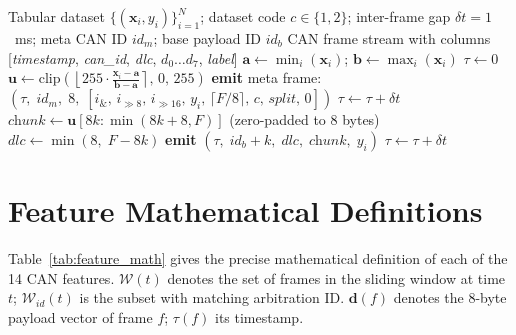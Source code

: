 \begin{algorithm}[t]
\caption{Tabular-to-CAN Frame Encoding}
\label{alg:b2can}
\begin{algorithmic}[1]
\Require Tabular dataset $\{(\mathbf{x}_i, y_i)\}_{i=1}^{N}$; dataset code $c \in \{1,2\}$;
         inter-frame gap $\delta t = 1$~ms; meta CAN ID $\textit{id}_m$; base payload ID $\textit{id}_b$
\Ensure CAN frame stream with columns [\textit{timestamp}, \textit{can\_id}, \textit{dlc}, $d_0\ldots d_7$, \textit{label}]
\State $\mathbf{a} \leftarrow \min_i(\mathbf{x}_i)$;\; $\mathbf{b} \leftarrow \max_i(\mathbf{x}_i)$ 
\State $\tau \leftarrow 0$
    \State $\mathbf{u} \leftarrow \mathrm{clip}\!\left(\left\lfloor 255 \cdot \tfrac{\mathbf{x}_i - \mathbf{a}}{\mathbf{b} - \mathbf{a}} \right\rceil,\, 0,\, 255\right)$ 
    \State \textbf{emit} meta frame: $(\tau,\; \textit{id}_m,\; 8,\;
           [i_{\&},\, i_{\gg 8},\, i_{\gg 16},\, y_i,\, \lceil F/8\rceil,\, c,\, \textit{split},\, 0])$
    \State $\tau \leftarrow \tau + \delta t$
        \State $\textit{chunk} \leftarrow \mathbf{u}[8k : \min(8k+8, F)]$ (zero-padded to 8 bytes)
        \State $\textit{dlc}   \leftarrow \min(8,\; F - 8k)$
        \State \textbf{emit} $(\tau,\; \textit{id}_b + k,\; \textit{dlc},\; \textit{chunk},\; y_i)$
        \State $\tau \leftarrow \tau + \delta t$
    \EndFor
\EndFor
\end{algorithmic}
\end{algorithm}

\section{Feature Mathematical Definitions}
\label{app:feature_math}

Table~\ref{tab:feature_math} gives the precise mathematical definition of each of the 14 CAN features. $\mathcal{W}(t)$ denotes the set of frames in the sliding window at time $t$; $\mathcal{W}_{\textit{id}}(t)$ is the subset with matching arbitration ID. $\mathbf{d}(f)$ denotes the 8-byte payload vector of frame $f$; $\tau(f)$ its timestamp.

